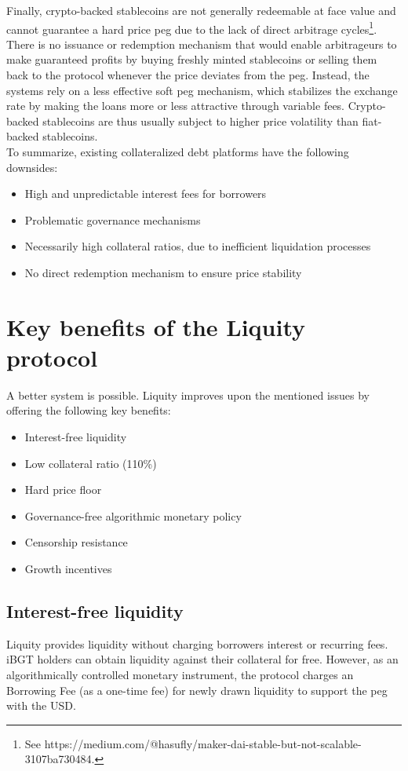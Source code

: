 \documentclass{article}
\begin{document}
Finally, crypto-backed stablecoins are not generally redeemable at face value and cannot guarantee a hard price peg due to the lack of direct arbitrage cycles\footnote{See https://medium.com/@hasufly/maker-dai-stable-but-not-scalable-3107ba730484.}. There is no issuance or redemption mechanism that would enable arbitrageurs to make guaranteed profits by buying freshly minted stablecoins or selling them back to the protocol whenever the price deviates from the peg. Instead, the systems rely on a less effective soft peg mechanism, which stabilizes the exchange rate by making the loans more or less attractive through variable fees. Crypto-backed stablecoins are thus usually subject to higher price volatility than fiat-backed stablecoins.\\

To summarize, existing collateralized debt platforms have the following downsides:
\begin{itemize}
    \item High and unpredictable interest fees for borrowers
    \item Problematic governance mechanisms
    \item Necessarily high collateral ratios, due to inefficient liquidation processes
    \item No direct redemption mechanism to ensure price stability
\end{itemize}
 
\section{Key benefits of the Liquity protocol}
A better system is possible. Liquity improves upon the mentioned issues by offering the following key benefits:
\begin{itemize}
    \item Interest-free liquidity
    \item Low collateral ratio (110\%)
    \item Hard price floor
    \item Governance-free algorithmic monetary policy
    \item Censorship resistance
    \item Growth incentives
\end{itemize}

\subsection{Interest-free liquidity}
Liquity provides liquidity without charging borrowers interest or recurring fees. iBGT holders can obtain liquidity against their collateral for free. However, as an algorithmically controlled monetary instrument, the protocol charges an Borrowing Fee (as a one-time fee) for newly drawn liquidity to support the peg with the USD.
\end{document}
